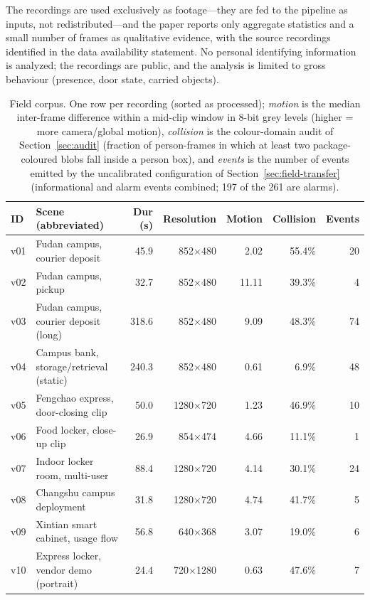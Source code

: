 \documentclass[journal,article,submit,oneauthor]{Definitions/mdpi}
\begin{document}
The recordings are used exclusively as footage---they are fed to the pipeline as inputs,
not redistributed---and the paper reports only aggregate statistics and a small number of
frames as qualitative evidence, with the source recordings identified in the data
availability statement. No personal identifying information is analyzed; the recordings are
public, and the analysis is limited to gross behaviour (presence, door state, carried
objects).

\begin{table}[H]
\caption{Field corpus. One row per recording (sorted as processed); \emph{motion} is the
median inter-frame difference within a mid-clip window in 8-bit grey levels
(higher = more camera/global motion),
\emph{collision} is the colour-domain audit of Section~\ref{sec:audit} (fraction of
person-frames in which at least two package-coloured blobs fall inside a person box), and
\emph{events} is the number of events emitted by the uncalibrated configuration of
Section~\ref{sec:field-transfer} (informational and alarm events combined; 197 of the 261
are alarms).\label{tab:field}}
\small
\setlength{\tabcolsep}{3pt}
\begin{tabularx}{\textwidth}{l X r r r r r}
\toprule
\textbf{ID} & \textbf{Scene (abbreviated)} & \textbf{Dur (s)} & \textbf{Resolution} & \textbf{Motion} & \textbf{Collision} & \textbf{Events} \\
\midrule
v01 & Fudan campus, courier deposit & 45.9 & 852$\times$480 & 2.02 & 55.4\% & 20 \\
v02 & Fudan campus, pickup & 32.7 & 852$\times$480 & 11.11 & 39.3\% & 4 \\
v03 & Fudan campus, courier deposit (long) & 318.6 & 852$\times$480 & 9.09 & 48.3\% & 74 \\
v04 & Campus bank, storage/retrieval (static) & 240.3 & 852$\times$480 & 0.61 & 6.9\% & 48 \\
v05 & Fengchao express, door-closing clip & 50.0 & 1280$\times$720 & 1.23 & 46.9\% & 10 \\
v06 & Food locker, close-up clip & 26.9 & 854$\times$474 & 4.66 & 11.1\% & 1 \\
v07 & Indoor locker room, multi-user & 88.4 & 1280$\times$720 & 4.14 & 30.1\% & 24 \\
v08 & Changshu campus deployment & 31.8 & 1280$\times$720 & 4.74 & 41.7\% & 5 \\
v09 & Xintian smart cabinet, usage flow & 56.8 & 640$\times$368 & 3.07 & 19.0\% & 6 \\
v10 & Express locker, vendor demo (portrait) & 24.4 & 720$\times$1280 & 0.63 & 47.6\% & 7 \\

\end{tabularx}
\end{table}
\end{document}
